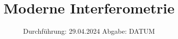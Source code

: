 

\subject{VERSUCH NUMMER 64}
\title{Moderne Interferometrie}
\date{
  Durchführung: 29.04.2024
  \hspace{3em}
  Abgabe: DATUM
}



\maketitle
\thispagestyle{empty}
\tableofcontents
\newpage
\setcounter{page}{1}







\newpage
\printbibliography
\nocite{ap64}
\nocite{matplotlib}
\nocite{numpy}
\nocite{scipy}
\nocite{uncertainties}
\nocite{reback2020pandas}

\newpage
%
%


